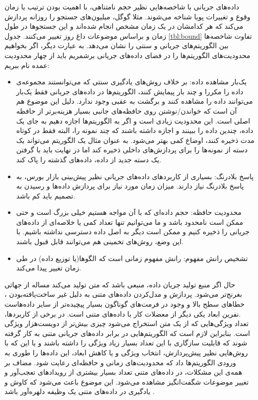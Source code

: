 داده‌های جریانی با شاخصه‌هایی نظیر حجم نامتناهی، با اهمیت بودن ترتیب یا زمان وقوع و تغییرات پویا شناخه می‌شوند. مثلا گوگل، میلیون‌های جستجو را روزانه پردازش می‌کند که هر کدامشان در یک زمان مشخص انجام شده‌اند و این جستجوها در طول زمان و براساس موضوعات داغ روز تغییر می‌کنند. جدول
\ref{tbl:bound}
تفاوت شاخصه‌ها بین الگوریتم‌های جریانی و سنتی را نشان می‌دهد. به عبارت دیگر، اگر بخواهیم محدودیت‌های الگوریتم‌ها را در فضای داده‌های جریانی برشمریم باید از چهار محدودیت عمده نام ببریم\cite{aggarwal2009data}:


\begin{itemize}
\item یک‌بار مشاهده داده: بر خلاف روش‌های یادگیری سنتی که می‌توانستند مجموعه‌‌ی داده را مکررا  و چند بار پیمایش کنند، الگوریتم‌ها در داده‌های جریانی فقط یک‌بار می‌توانند داده را مشاهده کنند و برگشت به عقبی وجود ندارد. دلیل این موضوع هم آن است که خواندن/نوشتن روی حافظه‌های جانبی بسیار هزینه‌برتر از حافظه اصلی است. این محدودیت زیادی است و اگر به الگوریتم‌ها اجازه دهیم به جای یک داده، چندین داده را ببینند و اجازه داشته باشند که چند نمونه را، البته فقط در کوتاه مدت ذخیره کنند، اوضاع کمی بهتر می‌شود. به عنوان مثال یک الگوریتم می‌تواند یک دسته از نمونه‌ها را برای پردازش‌های داخلی ذخیره کند اما در نهایت باید با گرفتن یک دسته جدید از داده، داده‌های گذشته را پاک کند. 
\item پاسخ بلادرنگ: بسیاری از کاربردهای داده‌های جریانی نظیر پیش‌بینی بازار بورس، به پاسخ بلادرنگ نیاز دارند. میزان زمان مورد نیاز برای پردازش داده‌ها و رسیدن به تصمیم باید کم باشد.
\item محدودیت حافظه: حجم‌ داده‌ای که با آن مواجه هستیم خیلی بزرگ است و حتی ممکن است نامحدود باشد و ما می‌توانیم تنها تعداد کمی یا خلاصه‌ای از داده‌های جریانی را ذخیره‌ کنیم و ممکن است دیگر به اصل داده دسترسی نداشته باشیم. با این وضع، روش‌های تخمینی هم می‌توانند قابل قبول باشند.
\item تشخیص رانش‌ مفهوم: رانش‌ مفهوم زمانی است که الگوها(یا توزیع داده) در طی زمان تغییر پیدا می‌کند.
\end{itemize}
حال اگر منبع تولید جریان داده، منبعی باشد که متن تولید می‌کند مساله از جهاتی بغرنج‌تر می‌شود. پردازش و مدل‌کردن داده‌های متنی به دلیل غیر ساخت‌یافته‌بودن
، خطاهای سطح بالا
و وجود در فرمت‌های گوناگون بسیار پیچیده‌تر از سایر داده‌هاست\cite{Nguyen2015}
.نفرین ابعاد
یکی دیگر از معضلات کار با داده‌های متنی است\cite{aggarwal2012mining}. در برخی از کاربردها، تعداد ویژگی‌هایی که از یک متن استخراج می‌شود چیزی بیش‌تر از دویست‌هزار ویژگی است. بنابراین لازم است که الگوریتم‌هایی در برابر داده‌های جریانی متنی به کار گرفته شوند که قابلیت سازگاری با این تعداد بسیار زیاد ویژگی را داشته باشند و یا این که با روش‌هایی نظیر پیش‌پردازش، انتخاب ویژگی و یا کاهش ابعاد، این داده‌ها را طوری به ورودی الگوریتم‌ها داد که محدودیت‌های زمانی و حافظه‌ای رعایت شود.
مضاف بر همه‌ی این مشکلات، در داده‌های متنی تعداد بسیار بیشتری از رویداد‌های تعجب‌آور و تغییر موضوعات شگفت‌انگیز مشاهده می‌شود. این موضوع باعث می‌شود که کاوش و یادگیری در داده‌های متنی یک وظیفه دلهره‌آور باشد\cite{Nguyen2015}
. 






